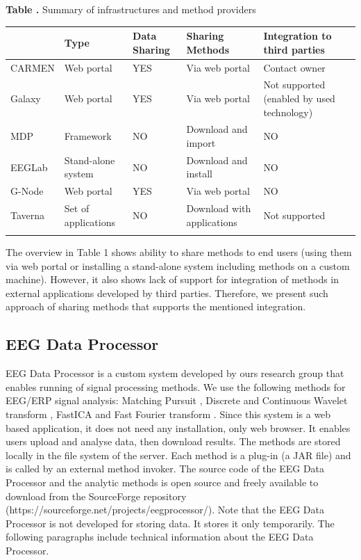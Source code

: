 \documentclass{frontiersSCNS} %
\begin{document}
\begin{table}[!t]
\textbf{\label{Tab:01} Table .}{ Summary of infrastructures and method providers }

\processtable{ }
{\begin{tabular}{lllll}\toprule
 & Type & Data Sharing & Sharing Methods & Integration to third parties \\\midrule

CARMEN & Web portal & YES & Via web portal & Contact owner\\\midrule
Galaxy &  Web portal & YES & Via web portal & Not supported (enabled by used technology)\\\midrule
MDP & Framework & NO & Download and import & NO\\\midrule
EEGLab & Stand-alone system & NO & Download and install & NO\\\midrule
G-Node & Web portal & YES & Via web portal & NO\\\midrule
Taverna & Set of applications & NO & Download with applications & Not supported\\\botrule
\end{tabular}}{}
\end{table}

The overview in Table 1 shows ability to share methods to end users (using them via web portal or installing a stand-alone system including methods on a custom machine). However, it also shows lack of support for integration of methods in external applications developed by third parties. Therefore, we present such approach of sharing methods that supports the mentioned integration.

\subsection{EEG Data Processor}

EEG Data Processor \cite{Jezek13} is a custom system developed by ours research group that enables running of signal processing methods. We use the following methods for EEG/ERP signal analysis: Matching Pursuit \cite{Vareka12}, Discrete and Continuous Wavelet transform \cite{Ciniburk10}, FastICA \cite{Hyv01} and Fast Fourier transform \cite{FFT}. Since this system is a web based application, it does not need any installation, only web browser. It enables users upload and analyse data, then download results. The methods are stored locally in the file system of the server. Each method is a plug-in (a JAR file) and is called by an external method invoker. The source code of the EEG Data Processor and the analytic methods is open source and freely available to download from the SourceForge repository (https://sourceforge.net/projects/eegprocessor/). Note that the EEG Data Processor is not developed for storing data. It stores it only temporarily. The following paragraphs include technical information about the EEG Data Processor.
\end{document}
